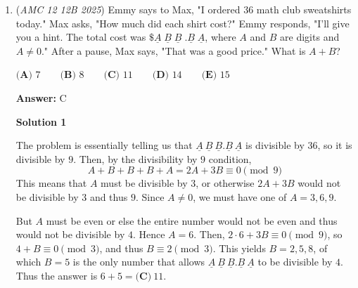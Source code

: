 \begin{enumerate}
 



\textbf{Solution 4 (Brute Force)}

List all the factors of 57 and 22 that are less than 400

 Iterate through and find a solution to find $x=2$ and $y=13$




\textbf{Solution 5 (Look at the Choices)}

Subtracting $35x$ from both sides, we find that
 \[22(x+y) = 400 - 35x.\]Since the right side is a multiple of $5$, so must the left, so $x+y$ is a multiple of $5$. Therefore, the only possible choices are $\textbf{(A) }10$ and $\textbf{(E) }15$. Plugging them in, we get
 \[220 = 400 - 35x\]or
 \[330 = 400 - 35x.\]Only the latter gives an integer value of $x$, so the answer is $\boxed{\textbf{(E) }15}$.

 


	\item (\textit{AMC 12 12B 2025}) Emmy says to Max, "I ordered $36$ math club sweatshirts today." Max asks, "How much did each shirt cost?" Emmy responds, "I'll give you a hint. The total cost was $\$\underline{A}\;\underline{B}\;\underline{B}\;.\underline{B}\;\underline{A}$, where $A$ and $B$ are digits and $A \neq 0$."  After a pause, Max says, "That was a good price." What is $A+B$?


 $\textbf{(A) } 7 \qquad\textbf{(B) } 8 \qquad\textbf{(C) } 11 \qquad\textbf{(D) } 14 \qquad\textbf{(E) } 15$

 \textbf{Answer: }C



\textbf{Solution 1}

The problem is essentially telling us that $\underline A~\underline B~\underline B.\underline B~\underline A$ is divisible by $36$, so it is divisible by $9$. Then, by the divisibility by $9$ condition,
 \[A+B+B+B+A=2A+3B\equiv 0\pmod{9}\]This means that $A$ must be divisible by $3$, or otherwise $2A+3B$ would not be divisible by $3$ and thus $9$. Since $A\ne0$, we must have one of $A=3,6,9$.

 But $A$ must be even or else the entire number would not be even and thus would not be divisible by $4$. Hence $A=6$. Then, $2\cdot 6+3B\equiv 0\pmod{9}$, so $4+B\equiv 0\pmod{3}$, and thus $B\equiv 2\pmod{3}$. This yields $B=2,5,8$, of which $B=5$ is the only number that allows $\underline A~\underline B~\underline B.\underline B~\underline A$ to be divisible by $4$. Thus the answer is $6+5=\boxed{\textbf{(C)}~11}$.


\end{enumerate}
